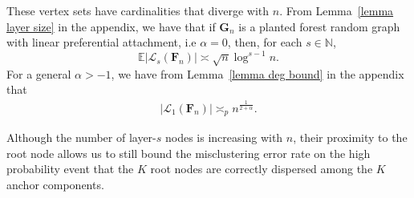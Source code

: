 \documentclass[twoside,11pt]{article}
\theoremstyle{remark}
\begin{document}
These vertex sets have cardinalities that diverge with $n$. From Lemma~\ref{lemma layer size} in the appendix, we have that if $\bm{G}_n$ is a planted forest random graph with linear preferential attachment, i.e $\alpha = 0$, then, for each $s \in \mathbb{N}$,
\[
\mathbb{E}| \mathcal{L}_s(\bm{F}_n)| \asymp \sqrt{n} \log^{s-1} n. 
\]
For a general $\alpha > -1$, we have from Lemma~\ref{lemma deg bound} in the appendix that
\begin{align}
| \mathcal{L}_1(\bm{F}_n) | \asymp_p n^{\frac{1}{2+\alpha}}. \label{eq:layer-1 size bound}
\end{align}

Although the number of layer-$s$ nodes is increasing with $n$, their proximity to the root node allows us to still bound the misclustering error rate on the high probability event that the $K$ root nodes are correctly dispersed among the $K$ anchor components. 

\end{document}
